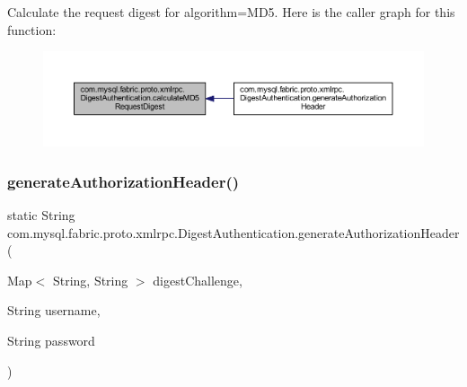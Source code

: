 Calculate the request digest for algorithm=M\+D5. Here is the caller graph for this function\+:\nopagebreak
\begin{figure}[H]
\begin{center}
\leavevmode
\includegraphics[width=350pt]{classcom_1_1mysql_1_1fabric_1_1proto_1_1xmlrpc_1_1_digest_authentication_a4fdd078d57ecac0859549c94bb2c1e8a_icgraph}
\end{center}
\end{figure}
\mbox{\label{classcom_1_1mysql_1_1fabric_1_1proto_1_1xmlrpc_1_1_digest_authentication_a7383e84a342b4945b22e8f3cca0b526d}} 
\subsubsection{\texorpdfstring{generate\+Authorization\+Header()}{generateAuthorizationHeader()}}
{\footnotesize\ttfamily static String com.\+mysql.\+fabric.\+proto.\+xmlrpc.\+Digest\+Authentication.\+generate\+Authorization\+Header (\begin{DoxyParamCaption}\item[{Map$<$ String, String $>$}]{digest\+Challenge,  }\item[{String}]{username,  }\item[{String}]{password }\end{DoxyParamCaption})\hspace{0.3cm}{\ttfamily [static]}}

